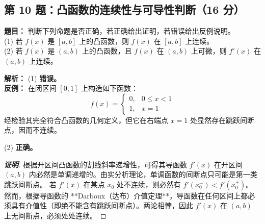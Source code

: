 \documentclass[11pt,a4paper]{article}
\begin{document}
	\begin{tcolorbox}[examstyle]
		\subsection*{第 10 题：凸函数的连续性与可导性判断（16 分）}
		\textbf{题目：} 判断下列命题是否正确，若正确给出证明，若错误给出反例说明。 \\
		(1) 若 $f(x)$ 是 $[a,b]$ 上的凸函数，则 $f(x)$ 在 $[a,b]$ 上连续。 \\
		(2) 若 $f(x)$ 是 $(a,b)$ 上的凸函数，且 $f(x)$ 在 $(a,b)$ 上可微，则 $f'(x)$ 在 $(a,b)$ 上连续。
		
		\textbf{解析：}
		(1) \textbf{错误。} \\
		\textbf{反例：} 在闭区间 $[0,1]$ 上构造如下函数：
		$$ f(x) = \begin{cases} 0, & 0 \le x < 1 \\ 1, & x = 1 \end{cases} $$
		经检验其完全符合凸函数的几何定义，但它在右端点 $x=1$ 处显然存在跳跃间断点，因而不连续。
		
		(2) \textbf{正确。}
		\begin{proof}[\textbf{证明}]
			根据开区间凸函数的割线斜率递增性，可得其导函数 $f'(x)$ 在开区间 $(a,b)$ 内必然是单调递增的。由实分析理论，单调函数的间断点只可能是第一类跳跃间断点。
			若 $f'(x)$ 在某点 $x_0$ 处不连续，则必然有 $f'(x_0^-) < f'(x_0^+)$。
			然而，根据导函数的 **Darboux（达布）介值定理**，导函数在任何区间上都必须具有介值性（即绝不能含有跳跃间断点）。两论相悖，因此 $f'(x)$ 在 $(a,b)$ 上无间断点，必须处处连续。
		\end{proof}
	\end{tcolorbox}
	
\end{document}

